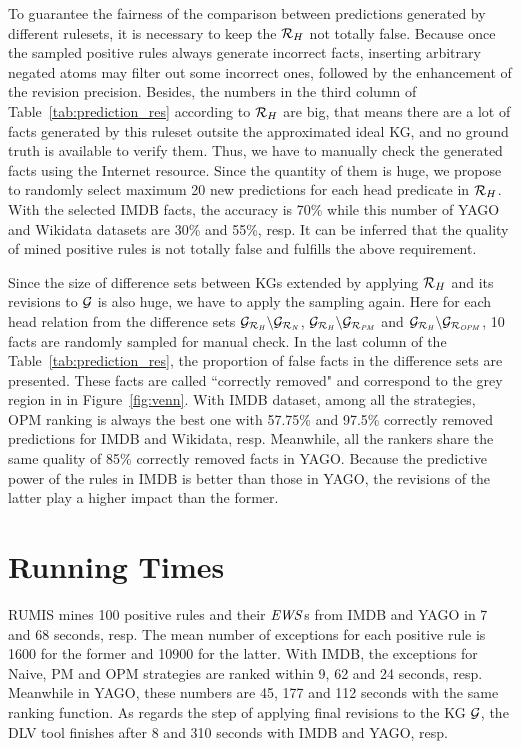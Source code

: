To guarantee the fairness of the comparison between predictions generated by different rulesets, it is necessary to keep the $\mathcal{R}_H$ not totally false. Because once the sampled positive rules always generate incorrect facts, inserting arbitrary negated atoms may filter out some incorrect ones, followed by the enhancement of the revision precision. Besides, the numbers in the third column of Table~\ref{tab:prediction_res} according to $\mathcal{R}_H$ are big, that means there are a lot of facts generated by this ruleset outsite the approximated ideal KG, and no ground truth is available to verify them. Thus, we have to manually check the generated facts using the Internet resource. Since the quantity of them is huge, we propose to randomly select maximum 20 new predictions for each head predicate in $\mathcal{R}_H$. With the selected IMDB facts, the accuracy is 70\% while this number of YAGO and Wikidata datasets are 30\% and 55\%, resp. It can be inferred that the quality of mined positive rules is not totally false and fulfills the above requirement.

Since the size of difference sets between KGs extended by applying $\mathcal{R}_H$ and its revisions to $\mathcal{G}$ is also huge, we have to apply the sampling again. Here for each head relation from the difference sets $\mathcal{G}_{\mathcal{R}_{\mathit{H}}}\backslash \mathcal{G}_{\mathcal{R}_{\mathit{N}}}$, $\mathcal{G}_{\mathcal{R}_{\mathit{H}}}\backslash \mathcal{G}_{\mathcal{R}_{\mathit{PM}}}$ and $\mathcal{G}_{\mathcal{R}_{\mathit{H}}}\backslash \mathcal{G}_{\mathcal{R}_{\mathit{OPM}}}$, 10 facts are randomly sampled for manual check. In the last column of the Table~\ref{tab:prediction_res}, the proportion of false facts in the difference sets are presented. These facts are called ``correctly removed" and correspond to the grey region in in Figure~\ref{fig:venn}. With IMDB dataset, among all the strategies, OPM ranking is always the best one with 57.75\% and 97.5\% correctly removed predictions for IMDB and Wikidata, resp. Meanwhile, all the rankers share the same quality of 85\% correctly removed facts in YAGO. Because the predictive power of the rules in IMDB is better than those in YAGO, the revisions of the latter play a higher impact than the former.

\section{Running Times}

RUMIS mines 100 positive rules and their $\mathit{EWS}$s from IMDB and YAGO in 7 and 68 seconds, resp. The mean number of exceptions for each positive rule is 1600 for the former and 10900 for the latter. With IMDB, the exceptions for Naive, PM and OPM strategies are ranked within 9, 62 and 24 seconds, resp. Meanwhile in YAGO, these numbers are 45, 177 and 112 seconds with the same ranking function. As regards the step of applying final revisions to the KG $\mathcal{G}$, the DLV tool finishes after 8 and 310 seconds with IMDB and YAGO, resp.

